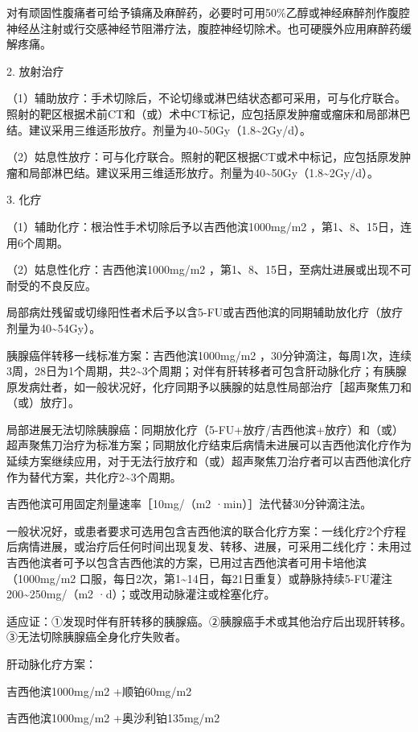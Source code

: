 对有顽固性腹痛者可给予镇痛及麻醉药，必要时可用50\%乙醇或神经麻醉剂作腹腔神经丛注射或行交感神经节阻滞疗法，腹腔神经切除术。也可硬膜外应用麻醉药缓解疼痛。

2. 放射治疗

（1）辅助放疗：手术切除后，不论切缘或淋巴结状态都可采用，可与化疗联合。照射的靶区根据术前CT和（或）术中CT标记，应包括原发肿瘤或瘤床和局部淋巴结。建议采用三维适形放疗。剂量为40\textasciitilde{}50Gy（1.8\textasciitilde{}2Gy/d）。

（2）姑息性放疗：可与化疗联合。照射的靶区根据CT或术中标记，应包括原发肿瘤和局部淋巴结。建议采用三维适形放疗。剂量为40\textasciitilde{}50Gy（1.8\textasciitilde{}2Gy/d）。

3. 化疗

（1）辅助化疗：根治性手术切除后予以吉西他滨1000mg/m{2}
，第1、8、15日，连用6个周期。

（2）姑息性化疗：吉西他滨1000mg/m{2}
，第1、8、15日，至病灶进展或出现不可耐受的不良反应。

局部病灶残留或切缘阳性者术后予以含5-FU或吉西他滨的同期辅助放化疗（放疗剂量为40\textasciitilde{}54Gy）。

胰腺癌伴转移一线标准方案：吉西他滨1000mg/m{2}
，30分钟滴注，每周1次，连续3周，28日为1个周期，共2\textasciitilde{}3个周期；对伴有肝转移者可包含肝动脉化疗；有胰腺原发病灶者，如一般状况好，化疗同期予以胰腺的姑息性局部治疗［超声聚焦刀和（或）放疗］。

局部进展无法切除胰腺癌：同期放化疗（5-FU+放疗/吉西他滨+放疗）和（或）超声聚焦刀治疗为标准方案；同期放化疗结束后病情未进展可以吉西他滨化疗作为延续方案继续应用，对于无法行放疗和（或）超声聚焦刀治疗者可以吉西他滨化疗作为替代方案，共化疗2\textasciitilde{}3个周期。

吉西他滨可用固定剂量速率［10mg/（m{2} ·min）］法代替30分钟滴注法。

一般状况好，或患者要求可选用包含吉西他滨的联合化疗方案：一线化疗2个疗程后病情进展，或治疗后任何时间出现复发、转移、进展，可采用二线化疗：未用过吉西他滨者可予以包含吉西他滨的方案，已用过吉西他滨者可用卡培他滨（1000mg/m{2}
口服，每日2次，第1\textasciitilde{}14日，每21日重复）或静脉持续5-FU灌注200\textasciitilde{}250mg/（m{2}
·d）；或改用动脉灌注或栓塞化疗。

适应证：①发现时伴有肝转移的胰腺癌。②胰腺癌手术或其他治疗后出现肝转移。③无法切除胰腺癌全身化疗失败者。

肝动脉化疗方案：

吉西他滨1000mg/m{2} +顺铂60mg/m{2}

吉西他滨1000mg/m{2} +奥沙利铂135mg/m{2}

